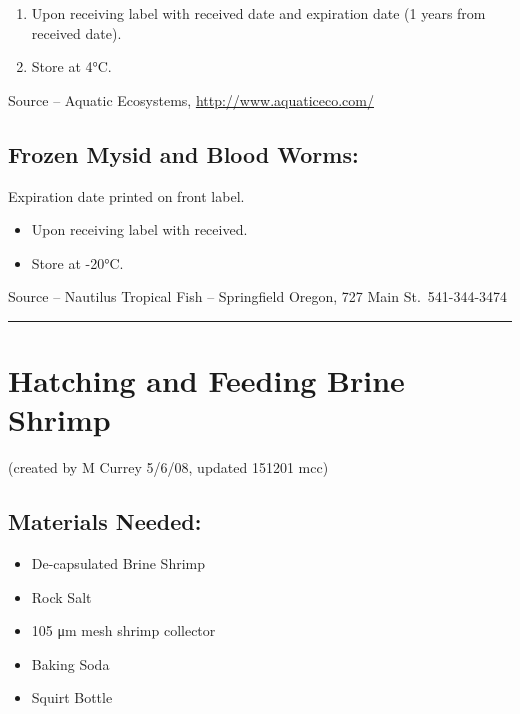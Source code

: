 \documentclass[
]{book}
\providecommand{\tightlist}{%
  \setlength{\itemsep}{0pt}\setlength{\parskip}{0pt}}
\begin{document}
\begin{enumerate}
\def\labelenumi{\arabic{enumi}.}
\tightlist
\item
  Upon receiving label with received date and expiration date (1 years from received date).
\item
  Store at 4°C.
\end{enumerate}

Source -- Aquatic Ecosystems, \url{http://www.aquaticeco.com/}

\hypertarget{frozen-mysid-and-blood-worms}{%
\subsection{Frozen Mysid and Blood Worms:}\label{frozen-mysid-and-blood-worms}}

Expiration date printed on front label.

\begin{itemize}
\tightlist
\item
  Upon receiving label with received.
\item
  Store at -20°C.
\end{itemize}

Source -- Nautilus Tropical Fish -- Springfield Oregon, 727 Main St.~541-344-3474

\begin{center}\rule{0.5\linewidth}{0.5pt}\end{center}

\hypertarget{hatching-and-feeding-brine-shrimp}{%
\section{Hatching and Feeding Brine Shrimp}\label{hatching-and-feeding-brine-shrimp}}

(created by M Currey 5/6/08, updated 151201 mcc)

\hypertarget{materials-needed-2}{%
\subsection{Materials Needed:}\label{materials-needed-2}}

\begin{itemize}
\tightlist
\item
  De-capsulated Brine Shrimp
\item
  Rock Salt
\item
  105 μm mesh shrimp collector
\item
  Baking Soda
\item
  Squirt Bottle
\end{itemize}
\end{document}
